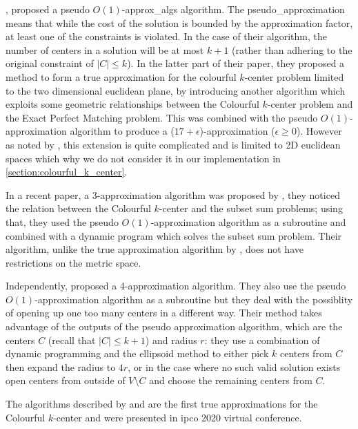 \citeauthor{bandyapadhyay_constant_2019}, proposed a pseudo $O(1)$-\gls{approx_algs} algorithm. The \gls{pseudo_approximation} means that while the cost of the solution is bounded by the approximation factor, at least one of the constraints is violated. In the case of their algorithm, the number of centers in a solution will be at most $k+1$ (rather than adhering to the original constraint of $|C|\leq k$). In the latter part of their paper, they proposed a method to form a true approximation for the colourful $k$-center problem limited to the two dimensional euclidean plane, by introducing another algorithm which exploits some geometric relationships between the Colourful $k$-center problem and the Exact Perfect Matching problem. This was combined with the pseudo $O(1)$-approximation algorithm to produce a ($17+\epsilon$)-approximation ($\epsilon\geq 0$). However as noted by \textcite{anegg_technique_2020}, this extension is quite complicated and is limited to 2D euclidean spaces which why we do not consider it in our implementation in \cref{section:colourful_k_center}.

In a recent paper, a 3-approximation algorithm was proposed by \textcite{jia_fair_2020}, they noticed the relation between the Colourful $k$-center and the subset sum problems; using that, they used the pseudo $O(1)$-approximation algorithm as a subroutine and combined with a dynamic program which solves the subset sum problem. Their algorithm, unlike the true approximation algorithm by \textcite{bandyapadhyay_constant_2019}, does not have restrictions on the metric space.

Independently, \textcite{anegg_technique_2020} proposed a 4-approximation algorithm. They also use the pseudo $O(1)$-approximation algorithm as a subroutine but they deal with the possiblity of opening up one too many centers in a different way. Their method takes advantage of the outputs of the pseudo approximation algorithm, which are the centers $C$ (recall that $|C|\leq k+1$) and radius $r$: they use a combination of dynamic programming and the ellipsoid method to either pick $k$ centers from $C$ then expand the radius to $4r$, or in the case where no such valid solution exists open centers from outside of $V\setminus C$ and choose the remaining centers from $C$.

The algorithms described by \textcite{jia_fair_2020} and \textcite{anegg_technique_2020} are the first true approximations for the Colourful $k$-center and were presented in \acrshort{ipco} 2020 virtual conference. 